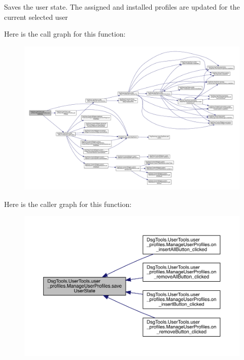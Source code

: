 \begin{DoxyVerb}Saves the user state.
The assigned and installed profiles are updated for the current selected user
\end{DoxyVerb}
 Here is the call graph for this function\+:
\nopagebreak
\begin{figure}[H]
\begin{center}
\leavevmode
\includegraphics[width=350pt]{class_dsg_tools_1_1_user_tools_1_1user__profiles_1_1_manage_user_profiles_aab13f3c960fb53ba706eff647605712b_cgraph}
\end{center}
\end{figure}
Here is the caller graph for this function\+:
\nopagebreak
\begin{figure}[H]
\begin{center}
\leavevmode
\includegraphics[width=350pt]{class_dsg_tools_1_1_user_tools_1_1user__profiles_1_1_manage_user_profiles_aab13f3c960fb53ba706eff647605712b_icgraph}
\end{center}
\end{figure}
\mbox{\label{class_dsg_tools_1_1_user_tools_1_1user__profiles_1_1_manage_user_profiles_a37b95df3524d16d437744c9a835251dd}} 
